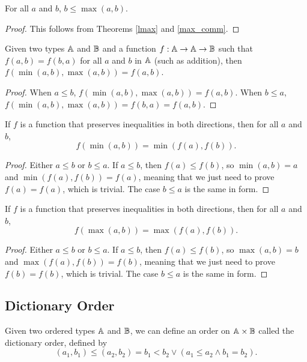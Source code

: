 \documentclass[../../math.tex]{subfiles}
\begin{document}
\begin{theorem} \label{rmax}
    For all $a$ and $b$, $b \leq \max(a, b)$.
\end{theorem}
\begin{proof}
    This follows from Theorems \ref{lmax} and \ref{max_comm}.
\end{proof}

\begin{theorem}
    Given two types $\mathbb{A}$ and $\mathbb{B}$ and a function $f : \mathbb{A} \rightarrow \mathbb{A}
    \rightarrow \mathbb{B}$ such that $f(a, b) = f(b, a)$ for all $a$ and $b$ in $\mathbb{A}$
    (such as addition), then $f(\min(a, b), \max(a, b)) = f(a, b)$.
\end{theorem}
\begin{proof}
    When $a \leq b$, $f(\min(a, b), \max(a, b)) = f(a, b)$.  When $b \leq a$,
    $f(\min(a, b), \max(a, b)) = f(b, a) = f(a, b)$.
\end{proof}

\begin{theorem} \label{homo-min}
    If $f$ is a function that preserves inequalities in both directions, then
    for all $a$ and $b$,
    \[
        f(\min(a, b)) = \min(f(a), f(b)).
    \]
\end{theorem}
\begin{proof}
    Either $a \leq b$ or $b \leq a$.  If $a \leq b$, then $f(a) \leq f(b)$, so
    $\min(a, b) = a$ and $\min(f(a), f(b)) = f(a)$, meaning that we just need to
    prove $f(a) = f(a)$, which is trivial.  The case $b \leq a$ is the same in
    form.
\end{proof}

\begin{theorem} \label{homo-max}
    If $f$ is a function that preserves inequalities in both directions, then
    for all $a$ and $b$,
    \[
        f(\max(a, b)) = \max(f(a), f(b)).
    \]
\end{theorem}
\begin{proof}
    Either $a \leq b$ or $b \leq a$.  If $a \leq b$, then $f(a) \leq f(b)$, so
    $\max(a, b) = b$ and $\max(f(a), f(b)) = f(b)$, meaning that we just need to
    prove $f(b) = f(b)$, which is trivial.  The case $b \leq a$ is the same in
    form.
\end{proof}

\subsection{Dictionary Order}

\begin{definition}
    Given two ordered types $\mathbb{A}$ and $\mathbb{B}$, we can define an order on $\mathbb{A} \times
    \mathbb{B}$ called the dictionary order, defined by
    \[
        (a_1, b_1) \leq (a_2, b_2) = b_1 < b_2 \vee (a_1 \leq a_2 \wedge b_1 =
        b_2).
    \]
\end{definition}
\end{document}
